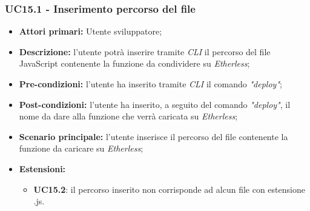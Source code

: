 \subsubsection{UC15.1 - Inserimento percorso del file}
\begin{itemize}
	\item \textbf{Attori primari:} Utente sviluppatore;
	\item \textbf{Descrizione:} l'utente potrà inserire tramite \textit{CLI\glo} il percorso del file JavaScript contenente la funzione da condividere su \textit{Etherless}; 
	\item \textbf{Pre-condizioni:} l'utente ha inserito tramite \textit{CLI\glo} il comando \textit{"deploy\glos"};
	\item \textbf{Post-condizioni:} l'utente ha inserito, a seguito del comando \textit{"deploy\glos"}, il nome da dare alla funzione che verrà caricata su \textit{Etherless};
	\item \textbf{Scenario principale:} l'utente inserisce il percorso del file contenente la funzione da caricare su \textit{Etherless};
	\item \textbf{Estensioni:} 
	\begin{itemize}
		\item \textbf{UC15.2}: il percorso inserito non corrisponde ad alcun file con estensione .js.
	\end{itemize}
\end{itemize}